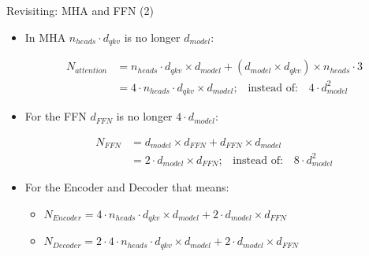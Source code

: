 
\begin{frame}{Revisiting: MHA and FFN (2)}

\begin{itemize}
    \item In MHA $n_{heads} \cdot d_{qkv}$ is no longer $d_{model}$:
		
					\begin{align*}
					N_{attention} &= n_{heads} \cdot d_{qkv} \times d_{model} + (d_{model} \times d_{qkv}) \times n_{heads} \cdot 3 \\
					&= 4\cdot n_{heads}\cdot d_{qkv} \times d_{model}\text{;}\quad \text{instead of:}\quad 4\cdot d_{model}^2
					\end{align*}
    
    \item For the FFN $d_{FFN}$ is no longer $4\cdot d_{model}$:

					\begin{align*}
					N_{FFN} &= d_{model} \times d_{FFN} + d_{FFN} \times d_{model} \\
					&= 2\cdot d_{model} \times d_{FFN}\text{;}\quad \text{instead of:}\quad 8\cdot d_{model}^2
					\end{align*}

    \item For the Encoder and Decoder that means:
    \begin{itemize}
        \item $N_{Encoder} = 4\cdot n_{heads}\cdot d_{qkv} \times d_{model} + 2\cdot d_{model} \times d_{FFN}$
        \item $N_{Decoder} = 2\cdot 4\cdot n_{heads}\cdot d_{qkv} \times d_{model} + 2\cdot d_{model} \times d_{FFN} $
    \end{itemize}

\end{itemize}
    
\end{frame}


